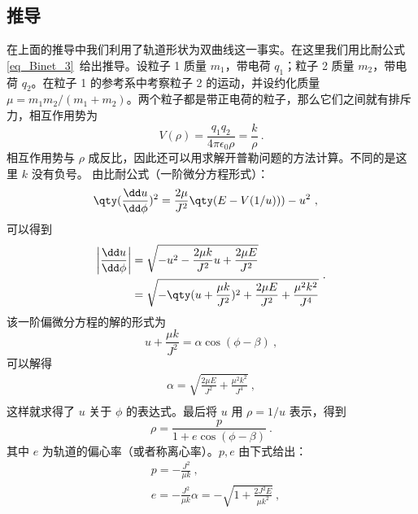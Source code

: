 \subsection{推导}
在上面的推导中我们利用了轨道形状为双曲线这一事实。在这里我们用比耐公式\autoref{eq_Binet_3}~给出推导。设粒子 1 质量 $m_1$，带电荷 $q_1$；粒子 2 质量 $m_2$，带电荷 $q_2$。在粒子 1 的参考系中考察粒子 2 的运动，并设约化质量 $\mu=m_1m_2/(m_1+m_2)$。两个粒子都是带正电荷的粒子，那么它们之间就有排斥力，相互作用势为
\begin{equation}
V(\rho)=\frac{q_1q_2}{4\pi\epsilon_0\rho}=\frac{k}{\rho}~.
\end{equation}
相互作用势与 $\rho$ 成反比，因此还可以用求解开普勒问题的方法计算。不同的是这里 $k$ 没有负号。
由比耐公式（一阶微分方程形式）：
\begin{equation}
\begin{aligned}
&\qty(\frac{\dd u}{\dd \phi})^2=\frac{2\mu}{J^2}\qty(E-V(1/u)))-u^2~,
\end{aligned}
\end{equation}
可以得到
\begin{equation}
\begin{aligned}
\left|\frac{\dd u}{\dd \phi}\right|&=\sqrt{-u^2-\frac{2\mu k}{J^2}u+\frac{2\mu E}{J^2}}\\
&=\sqrt{-\qty(u+\frac{\mu k}{J^2})^2+\frac{2\mu E}{J^2}+\frac{\mu^2 k^2}{J^4}}
\end{aligned}~.
\end{equation}
该一阶偏微分方程的解的形式为
\begin{equation}
u+\frac{\mu k}{J^2}=\alpha\cos(\phi-\beta)~,
\end{equation}
可以解得
\begin{equation}
\begin{aligned}
\alpha=\sqrt{\frac{2\mu E}{J^2}+\frac{\mu^2 k^2}{J^4}}~,\\
\end{aligned}
\end{equation}
这样就求得了 $u$ 关于 $\phi$ 的表达式。最后将 $u$ 用 $\rho=1/u$ 表示，得到
\begin{equation}
\rho=\frac{p}{1+e\cos(\phi-\beta)}~.
\end{equation}
其中 $e$ 为轨道的偏心率（或者称离心率）。$p,e$ 由下式给出：
\begin{equation}
\begin{aligned}
&p=-\frac{J^2}{\mu k}~,\\
&e=-\frac{J^2}{\mu k}\alpha=-\sqrt{1+\frac{2J^2E}{\mu k^2}}~,
\end{aligned}
\end{equation}
